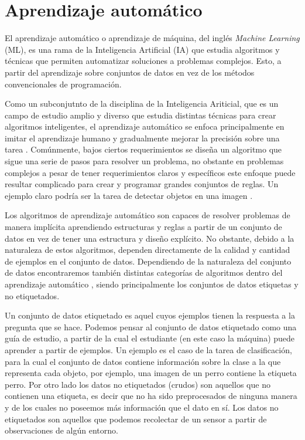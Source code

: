 \section{Aprendizaje automático}
\label{sec:ML}

El aprendizaje automático o aprendizaje de máquina, del inglés \textit{Machine Learning} (ML), es una rama de la Inteligencia Artificial (IA) que estudia algoritmos y técnicas que permiten automatizar soluciones a problemas complejos. Esto, a partir del aprendizaje sobre conjuntos de datos en vez de los métodos convencionales de programación. 

Como un subconjutnto de la disciplina de la Inteligencia Ariticial, que es un campo de estudio amplio y diverso que estudia distintas técnicas para crear algoritmos inteligentes, el aprendizaje automático se enfoca principalmente en imitar el aprendizaje humano y gradualmente mejorar la precisión sobre una tarea \cite{ibm_what_nodate}. Comúnmente, bajos ciertos requerimientos se diseña un algoritmo que sigue una serie de pasos para resolver un problema, no obstante en problemas complejos a pesar de tener requerimientos claros y específicos este enfoque puede resultar complicado para crear y programar grandes conjuntos de reglas. Un ejemplo claro podría ser la tarea de detectar objetos en una imagen \cite{rebala_introduction_2019}.

Los algoritmos de aprendizaje automático son capaces de resolver problemas de manera implícita aprendiendo estructuras y reglas a partir de un conjunto de datos en vez de tener una estructura y diseño explícito. No obstante, debido a la naturaleza de estos algoritmos, dependen directamente de la calidad y cantidad de ejemplos en el conjunto de datos. Dependiendo de la naturaleza del conjunto de datos encontraremos también distintas categorías de algoritmos dentro del aprendizaje automático \cite{rebala_introduction_2019}, siendo principalmente los conjuntos de datos etiquetas y no etiquetados.

Un conjunto de datos etiquetado es aquel cuyos ejemplos tienen la respuesta a la pregunta que se hace. Podemos pensar al conjunto de datos etiquetado como una guía de estudio, a partir de la cual el estudiante (en este caso la máquina) puede aprender a partir de ejemplos. Un ejemplo es el caso de la tarea de clasificación, para la cual el conjunto de datos contiene información sobre la clase a la que representa cada objeto, por ejemplo, una imagen de un perro contiene la etiqueta perro. Por otro lado los datos no etiquetados (crudos) son aquellos que no contienen una etiqueta, es decir que no ha sido preprocesados de ninguna manera y de los cuales no poseemos más información que el dato en sí. Los datos no etiquetados son aquellos que podemos recolectar de un sensor a partir de observaciones de algún entorno.

